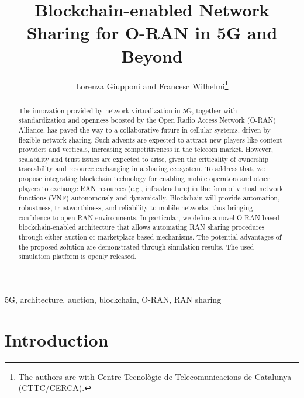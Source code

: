 \documentclass[journal]{IEEEtran}
\title{Blockchain-enabled Network Sharing for O-RAN in 5G and Beyond}
\author{Lorenza Giupponi and Francesc Wilhelmi\thanks{The authors are with Centre Tecnol\`ogic de Telecomunicacions de Catalunya (CTTC/CERCA).}}
\begin{document}
	\maketitle
	
	\begin{abstract}
		The innovation provided by network virtualization in 5G, together with standardization and openness boosted by the Open Radio Access Network (O-RAN) Alliance, has paved the way to a collaborative future in cellular systems, driven by flexible network sharing. Such advents are expected to attract new players like content providers and verticals, increasing competitiveness in the telecom market. However, scalability and trust issues are expected to arise, given the criticality of ownership traceability and resource exchanging in a sharing ecosystem. To address that, we propose integrating blockchain technology for enabling mobile operators and other players to exchange RAN resources (e.g., infrastructure) in the form of virtual network functions (VNF) autonomously and dynamically. Blockchain will provide automation, robustness, trustworthiness, and reliability to mobile networks, thus bringing confidence to open RAN environments. In particular, we define a novel O-RAN-based blockchain-enabled architecture that allows automating RAN sharing procedures through either auction or marketplace-based mechanisms. The potential advantages of the proposed solution are demonstrated through simulation results. The used simulation platform is openly released.
	\end{abstract}
	
	\begin{IEEEkeywords}
		5G, architecture, auction, blockchain, O-RAN, RAN sharing
	\end{IEEEkeywords}
	
	\IEEEpeerreviewmaketitle
	
	\section{Introduction}
	
\end{document}
